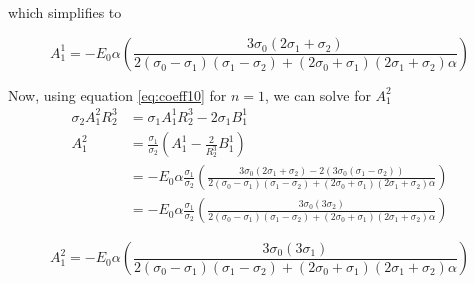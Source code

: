which simplifies to
\begin{mdframed}[backgroundcolor=gray!10, innertopmargin=0pt, innerbottommargin=10pt]
    \begin{equation}
        A_1^1=
        -E_0 \alpha \left(
        \frac{
        3 \sigma_0 (2\sigma_1 + \sigma_2)
        }
        {
        2 (\sigma_0-\sigma_1)(\sigma_1 - \sigma_2) + (2\sigma_0 + \sigma_1)(2\sigma_1 + \sigma_2)\alpha
        }
        \right)
        \label{eq:A11}
    \end{equation}
\end{mdframed}
Now, using equation \ref{eq:coeff10} for $n=1$, we can solve for $A_1^2$
\begin{displaymath}
    \begin{split}
        \sigma_2  A_1^2 R_2^3
        & =
        \sigma_1 A_1^1 R_2^3
        - 2 \sigma_1 B_1^1
        \\
        A_1^2
        & =
        \frac{\sigma_1}{\sigma_2}
        \left(
         A_1^1
        - \frac{2}{R_2^3} B_1^1
        \right)
        \\
        & =
        -E_0 \alpha \frac{\sigma_1}{\sigma_2}
         \left(
        \frac{
        3 \sigma_0 (2\sigma_1 + \sigma_2) - 2 (3 \sigma_0 (\sigma_1 - \sigma_2))
        }
        {
        2 (\sigma_0-\sigma_1)(\sigma_1 - \sigma_2) + (2\sigma_0 + \sigma_1)(2\sigma_1 + \sigma_2)\alpha
        }
        \right)
        \\
        & =
        -E_0 \alpha \frac{\sigma_1}{\sigma_2}
         \left(
        \frac{
        3 \sigma_0 (3\sigma_2)
        }
        {
        2 (\sigma_0-\sigma_1)(\sigma_1 - \sigma_2) + (2\sigma_0 + \sigma_1)(2\sigma_1 + \sigma_2)\alpha
        }
        \right)
    \end{split}
\end{displaymath}
\begin{mdframed}[backgroundcolor=gray!10, innertopmargin=0pt, innerbottommargin=10pt]
\begin{equation}
        A_1^2
        =
        -E_0 \alpha
         \left(
        \frac{
        3 \sigma_0 (3\sigma_1)
        }
        {
        2 (\sigma_0-\sigma_1)(\sigma_1 - \sigma_2) + (2\sigma_0 + \sigma_1)(2\sigma_1 + \sigma_2)\alpha
        }
        \right)
        \label{eq:A12}
\end{equation}
\end{mdframed}

